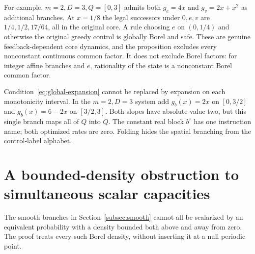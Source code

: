 \documentclass[11pt,reqno]{amsart}
\numberwithin{equation}{section}
\theoremstyle{definition}
\theoremstyle{definition}
\begin{document}
For example, $m=2,D=3,Q=[0,3]$ admits both $g_e=4x$ and
$g_v=2x+x^2$ as additional branches. At $x=1/8$ the legal
successors under $0,e,v$ are $1/4,1/2,17/64$, all in the original
core. A rule choosing $e$ on $(0,1/4)$ and otherwise the original
greedy control is globally Borel and safe. These are genuine
feedback-dependent core dynamics, and the proposition excludes every
nonconstant continuous common factor. It does not exclude Borel
factors: for integer affine branches and $e$, rationality of the
state is a nonconstant Borel common factor.

Condition~\eqref{eq:global-expansion} cannot be replaced by expansion
on each monotonicity interval. In the $m=2,D=3$ system add
$g_b(x)=2x$ on $[0,3/2]$ and $g_b(x)=6-2x$ on $[3/2,3]$.
Both slopes have absolute value two, but this single branch maps
all of $Q$ into $Q$. The constant real block $b^\tau$ has one
instruction name; both optimized rates are zero. Folding hides
the spatial branching from the control-label alphabet.

\section{A bounded-density obstruction to simultaneous scalar capacities}
\label{app:measure}
The smooth branches in Section~\ref{subsec:smooth} cannot all be
scalarized by an equivalent probability with a density bounded both
above and away from zero. The proof treats every such Borel density,
without inserting it at a null periodic point.
\end{document}
